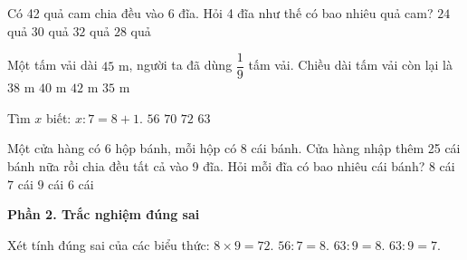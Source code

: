 \begin{ex} %
Có 42 quả cam chia đều vào 6 đĩa. Hỏi 4 đĩa như thế có bao nhiêu quả cam?
\choice
{$24$ quả}
{$30$ quả}
{$32$ quả}
{\True $28$ quả}
\end{ex}

\begin{ex} %
Một tấm vải dài $45\text{ m}$, người ta đã dùng $\dfrac{1}{9}$ tấm vải. Chiều dài tấm vải còn lại là
\choice
{$38\text{ m}$}
{\True $40\text{ m}$}
{$42\text{ m}$}
{$35\text{ m}$}
\end{ex}

\begin{ex} %
Tìm $x$ biết: $x : 7 = 8 + 1$.
\choice
{$56$}
{$70$}
{$72$}
{\True $63$}
\end{ex}

\begin{ex} %
Một cửa hàng có 6 hộp bánh, mỗi hộp có 8 cái bánh. Cửa hàng nhập thêm 25 cái bánh nữa rồi chia đều tất cả vào 9 đĩa. Hỏi mỗi đĩa có bao nhiêu cái bánh?
\choice
{\True $8$ cái}
{$7$ cái}
{$9$ cái}
{$6$ cái}
\end{ex}

\textbf{Phần 2. Trắc nghiệm đúng sai}

\begin{ex} %
Xét tính đúng sai của các biểu thức:
\choiceTF
{\True $8 \times 9 = 72$.}
{\True $56 : 7 = 8$.}
{$63 : 9 = 8$.}
{\True $63 : 9 = 7$.}
\end{ex}


